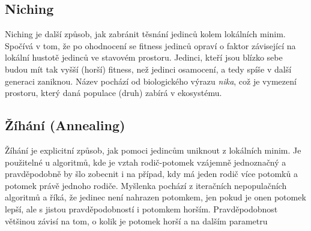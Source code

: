 \subsection{Niching}

Niching je další způsob, jak zabránit těsnání jedinců kolem lokálních minim. Spočívá v tom, že po ohodnocení se fitness jedinců opraví o faktor závisející na lokální hustotě jedinců ve stavovém prostoru. Jedinci, kteří jsou blízko sebe budou mít tak vyšší (horší) fitness, než jedinci osamocení, a tedy spíše v další generaci zaniknou. Název pochází od biologického výrazu \emph{nika}, což je vymezení prostoru, který daná populace (druh) zabírá v ekosystému.

\subsection{Žíhání (Annealing)}

Žíhání je explicitní způsob, jak pomoci jedincům uniknout z lokálních minim. Je použitelné u algoritmů, kde je vztah rodič-potomek vzájemně jednoznačný a pravděpodobně by šlo zobecnit i na případ, kdy má jeden rodič více potomků a potomek právě jednoho rodiče. Myšlenka pochází z iteračních nepopulačních algoritmů a říká, že jedinec není nahrazen potomkem, jen pokud je onen potomek lepší, ale s jistou pravděpodobností i potomkem horším. Pravděpodobnost většinou závisí na tom, o kolik je potomek horší a na dalším parametru

